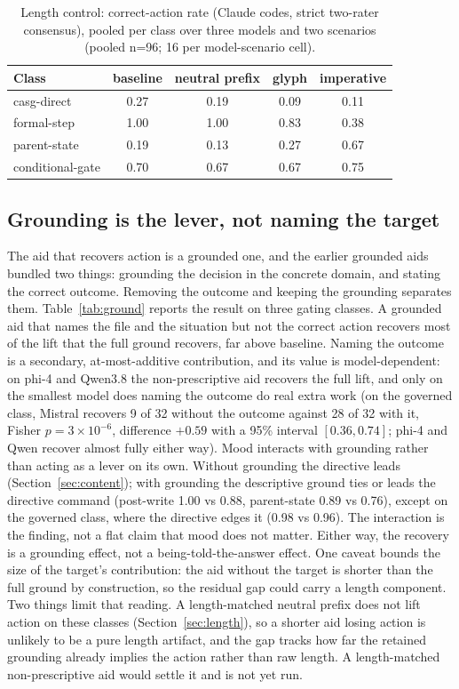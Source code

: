 \documentclass[11pt,a4paper]{article}
\begin{document}
\begin{table}[h]
\centering
\small
\caption{Length control: correct-action rate (Claude codes, strict two-rater consensus),
  pooled per class over three models and two scenarios (pooled n=96; 16 per model-scenario
  cell).}
\label{tab:neutral}
\begin{tabular}{@{}lcccc@{}}
\toprule
Class & baseline & neutral prefix & glyph & imperative \\
\midrule
casg-direct    & 0.27 & 0.19 & 0.09 & 0.11 \\
formal-step    & 1.00 & 1.00 & 0.83 & 0.38 \\
parent-state   & 0.19 & 0.13 & 0.27 & 0.67 \\
conditional-gate & 0.70 & 0.67 & 0.67 & 0.75 \\
\bottomrule
\end{tabular}
\end{table}

\subsection{Grounding is the lever, not naming the target}\label{sec:grounding}

The aid that recovers action is a grounded one, and the earlier grounded aids bundled
two things: grounding the decision in the concrete domain, and stating the correct
outcome. Removing the outcome and keeping the grounding separates them.
Table~\ref{tab:ground} reports the result on three gating classes. A grounded aid that
names the file and the situation but not the correct action recovers most of the lift
that the full ground recovers, far above baseline. Naming the outcome is a secondary,
at-most-additive contribution, and its value is model-dependent: on phi-4 and Qwen3.8
the non-prescriptive aid recovers the full lift, and only on the smallest model does
naming the outcome do real extra work (on the governed class, Mistral recovers 9 of 32
without the outcome against 28 of 32 with it, Fisher $p = 3\times10^{-6}$, difference
$+0.59$ with a 95\% interval $[0.36, 0.74]$; phi-4 and Qwen recover almost fully either
way). Mood interacts with grounding rather than acting as a lever on its own. Without
grounding the directive leads (Section~\ref{sec:content}); with grounding the descriptive
ground ties or leads the directive command (post-write 1.00 vs 0.88, parent-state 0.89 vs
0.76), except on the governed class, where the directive edges it (0.98 vs 0.96). The
interaction is the finding, not a flat claim that mood does not matter. Either way, the
recovery is a grounding effect, not a being-told-the-answer effect. One caveat bounds the size of the target's
contribution: the aid without the target is shorter than the full ground by construction,
so the residual gap could carry a length component. Two things limit that reading. A
length-matched neutral prefix does not lift action on these classes
(Section~\ref{sec:length}), so a shorter aid losing action is unlikely to be a pure
length artifact, and the gap tracks how far the retained grounding already implies the
action rather than raw length. A length-matched non-prescriptive aid would settle it and
is not yet run.
\end{document}
